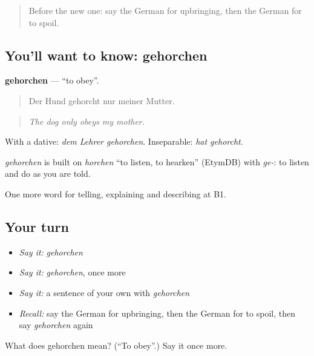 \begin{quote}
Before the new one: say the German for upbringing, then the German for to spoil.
\end{quote}

\subsection*{You'll want to know: gehorchen}
\textbf{gehorchen} — \textquotedblleft{}to obey\textquotedblright{}.

\begin{quote}
Der Hund gehorcht nur meiner Mutter.
\end{quote}

\begin{quote}
\emph{The dog only obeys my mother.}
\end{quote}

With a dative: \emph{dem Lehrer gehorchen}. Inseparable: \emph{hat gehorcht}.

\begin{cousinweb}
\emph{gehorchen} is built on \emph{horchen} \textquotedblleft{}to listen, to hearken\textquotedblright{} (EtymDB) with \emph{ge-}: to listen and do as you are told.
\end{cousinweb}

\begin{grammarlens}[title={What you've built}]
One more word for telling, explaining and describing at B1.
\end{grammarlens}

\subsection*{Your turn}
\begin{itemize}
\raggedright
  \item \emph{Say it:} \emph{gehorchen}
  \item \emph{Say it:} \emph{gehorchen}, once more
  \item \emph{Say it:} a sentence of your own with \emph{gehorchen}
  \item \emph{Recall:} say the German for upbringing, then the German for to spoil, then say \emph{gehorchen} again
\end{itemize}

\begin{tcolorbox}[breakable,colback=teal!4,colframe=teal!35!black,title={Before you move on}]
What does gehorchen mean? (\textquotedblleft{}To obey\textquotedblright{}.) Say it once more.
\end{tcolorbox}

